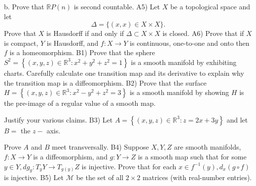 \documentclass[14pt]{extarticle}
\begin{document}
b. Prove that $\mathbb{R} P(n)$ is second countable.
\newpage
A5) Let $X$ be a topological space and let
$$
\Delta=\{(x, x) \in X \times X\} .
$$
Prove that $X$ is Hausdorff if and only if $\Delta \subset X \times X$ is closed.
\newpage
A6) Prove that if $X$ is compact, $Y$ is Hausdorff, and $f: X \rightarrow Y$ is continuous, one-to-one and onto then $f$ is a homeomorphism.
\newpage
B1) Prove that the sphere $S^{2}=\left\{(x, y, z) \in \mathbb{R}^{3}: x^{2}+y^{2}+z^{2}=1\right\}$ is a smooth manifold by exhibiting charts. Carefully calculate one transition map and its derivative to explain why the transition map is a diffeomorphism.
\newpage
B2) Prove that the surface $H=\left\{(x, y, z) \in \mathbb{R}^{3}: x^{2}-y^{2}+z^{2}=3\right\}$ is a smooth manifold by showing $H$ is the pre-image of a regular value of a smooth map.

Justify your various claims.
\newpage
B3) Let $A=\left\{(x, y, z) \in \mathbb{R}^{3}: z=2 x+3 y\right\}$ and let $B=$ the $z-$ axis.

Prove $A$ and $B$ meet transversally.
\newpage
B4) Suppose $X, Y, Z$ are smooth manifolds, $f: X \rightarrow Y$ is a diffeomorphism, and $g: Y \rightarrow Z$ is a smooth map such that for some $y \in Y, d g_{y}: T_{y} Y \rightarrow T_{g(y)} Z$ is injective. Prove that for each $x \in f^{-1}(y), d_{x}(g \circ f)$ is injective.
\newpage
B5) Let $\mathcal{M}$ be the set of all $2 \times 2$ matrices (with real-number entries).
\end{document}
